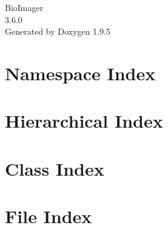 \documentclass[twoside]{book}
\newcommand{\+}{\discretionary{\mbox{\scriptsize$\hookleftarrow$}}{}{}}
\newcommand{\clearemptydoublepage}{%
    \newpage{\pagestyle{empty}\cleardoublepage}%
  }
\begin{document}
  \raggedbottom
    \hypersetup{pageanchor=false,
                bookmarksnumbered=true,
                pdfencoding=unicode
               }
  \begin{titlepage}
  \vspace*{7cm}
  \begin{center}%
  {\Large Bio\+Imager}\\
  [1ex]\large 3.\+6.\+0 \\
  \vspace*{1cm}
  {\large Generated by Doxygen 1.9.5}\\
  \end{center}
  \end{titlepage}
  \clearemptydoublepage
  \tableofcontents
  \clearemptydoublepage
  \hypersetup{pageanchor=true}
\chapter{Namespace Index}

\chapter{Hierarchical Index}

\chapter{Class Index}

\chapter{File Index}

\end{document}
